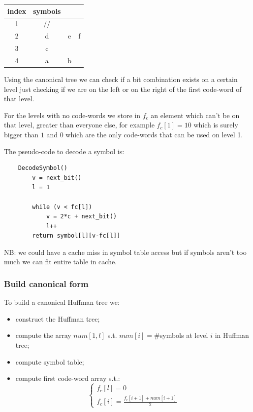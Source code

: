 \begin{table}[H]
    \centering
    \begin{tabular}{c|c c c}
        index & symbols \\
        \hline
        1 & // & & \\
        2 & d & e & f \\
        3 & c & & \\
        4 & a & b & \\
    \end{tabular}
\end{table}

Using the canonical tree we can check if a bit combination exists on a certain level just checking if we are on the left or on the right of the first code-word of that level.

For the levels with no code-words we store in $f_c$ an element which can't be on that level, greater than everyone else, for example $f_c[1] = 10$ which is surely bigger than $1$ and $0$ which are the only code-words that can be used on level 1.

The pseudo-code to decode a symbol is:
\begin{verbatim}
    DecodeSymbol()
        v = next_bit()
        l = 1
        
        while (v < fc[l])
            v = 2*c + next_bit()
            l++
        return symbol[l][v-fc[l]]
\end{verbatim}

NB: we could have a cache miss in symbol table access but if symbols aren't too much we can fit entire table in cache.

\subsubsection{Build canonical form}
To build a canonical Huffman tree we:
\begin{itemize}
    \item construct the Huffman tree;
    \item compute the array $num[1, l]$ s.t. $num[i] = \#$symbols at level $i$ in Huffman tree;
    \item compute symbol table;
    \item compute first code-word array s.t.:
    \begin{equation}
        \begin{cases}
            f_c[l] = 0 \\
            f_c[i] = \frac{f_c[i+1] + num[i+1]}{2}
        \end{cases}
    \end{equation}
\end{itemize}

